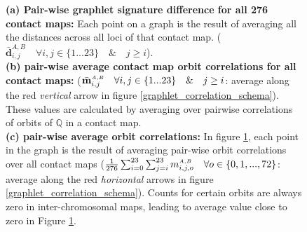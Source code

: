 \documentclass[a4,center,fleqn]{NAR}
\begin{document}
\begin{figure}
\begin{subfigure}[b]{.5\textwidth}
        \caption{}
        \label{fig:orbits_correlations_all}
    \end{subfigure}
    \caption{   
        \textbf{(a) Pair-wise graphlet signature difference for
        all 276 contact maps:}
        Each point on a graph is the result of averaging all
        the distances across all loci of that contact map.
        ($\bar{\mathbf{d}}^{\scriptscriptstyle A,B}_{i,j} \quad
        \forall i,j \in \{1 ... 23\} \quad \& \quad j \ge i$).  
        \vspace{.1cm} \\
        \textbf{(b) pair-wise average contact map orbit correlations
         for all contact maps:}
        ($\bar{\mathbf{m}}^{\scriptscriptstyle \scriptscriptstyle A,B}_{i,j} 
        \quad \forall i,j \in \{1 ... 23\} \quad \& \quad j \ge i$:
        average along the red \textit{vertical} arrow in figure 
        \ref{graphlet_correlation_schema}).
        These values are calculated by averaging over 
        pairwise correlations of orbits of
        $\mathbb{Q}$ in a contact map.
        \vspace{.1cm} \\
        \textbf{(c) pair-wise average orbit correlations:}
        In figure \ref{fig:orbits_correlations_all}, each point
        in the graph is the result of averaging pair-wise
        orbit correlations over all contact maps
        ($\frac{1}{276}\sum_{i=0}^{23}\sum_{j=i}^{23}{
        m^{\scriptscriptstyle \scriptscriptstyle A,B}_{i,j, o}} \quad 
        \forall o \in \{0, 1, ..., 72\}$:
        average along the red \textit{horizontal} arrows in figure 
        \ref{graphlet_correlation_schema}).
        Counts for certain orbits are always zero in inter-chromosomal
        maps, leading to average value close to zero in 
        Figure \ref{fig:orbits_correlations_all}.
     }
    \label{fig:results_all}
\end{figure}
\end{document}

